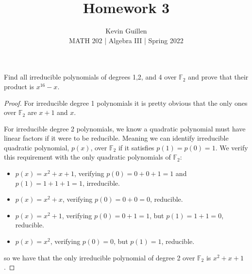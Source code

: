 \documentclass[11pt]{article}
\newenvironment{problem}[2][Problem\!]{\begin{trivlist}
\item[\hskip \labelsep {\bfseries #1}\hskip \labelsep {\bfseries #2}]}{\end{trivlist}}
\begin{document}
 
\title{Homework 3}
\author{Kevin Guillen\\[0.5em]
MATH 202 | Algebra III | Spring 2022}
\date{} 
\maketitle

\begin{tcolorbox}
    \begin{problem}{13.5.2}
        Find all irreducible polynomials of degrees 1,2, and 4 over $\mathbb{F}_2$ and prove that their product is $x^{16} - x$.
    \end{problem}
\end{tcolorbox}


    \begin{proof}
        For irreducible degree 1 polynomials it is pretty obvious that the only ones over $\mathbb{F}_2$ are $x + 1$ and $x$. 

        For irreducible degree 2 polynomials, we know a quadratic polynomial must have linear factors if it were to be reducible. Meaning we can identify irreducible quadratic polynomial, $p(x)$, over $\mathbb{F}_2$ if it satisfies $p(1) = p(0) = 1$. We verify this requirement with the only quadratic polynomials of $\mathbb{F}_2$:
        \begin{itemize}
            \item $p(x) = x^{2} + x + 1$, verifying $p(0) =0 + 0 + 1 = 1$ and $p(1) = 1 + 1 + 1 = 1$, irreducible.
            \item $p(x) = x^{2} + x$, verifying $p(0) = 0 + 0 = 0$, reducible.
            \item $p(x) = x^{2} + 1$, verifying $p(0) = 0 + 1 = 1$, but $p(1) = 1 + 1 = 0$, reducible. 
            \item $p(x) = x^{2}$, verifying $p(0) = 0$, but $p(1) = 1$, reducible. 
        \end{itemize} 
        so we have that the only irreducible polynomial of degree 2 over $\mathbb{F}_2$ is $x^{2} + x + 1$. 


\end{proof}
\end{document}
